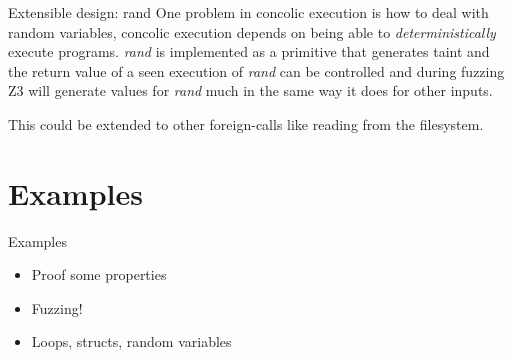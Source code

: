 \documentclass[aspectratio=169]{beamer}
\begin{document}
  \begin{frame}
      \begin{block}{Extensible design: rand}
          One problem in concolic execution is how to deal with random variables, concolic execution depends on being able to \emph{deterministically} execute programs.
          \emph{rand} is implemented as a primitive that generates taint and the return value of a seen execution of \emph{rand} can be controlled and during fuzzing
          Z3 will generate values for \emph{rand} much in the same way it does for other inputs.

          This could be extended to other foreign-calls like reading from the filesystem.
      \end{block}
  \end{frame}
  \section{Examples}
  \begin{frame}{Examples}
    \begin{itemize}
        \item Proof some properties
        \item Fuzzing!
        \item Loops, structs, random variables
     \end{itemize}
  \end{frame}
\end{document}
